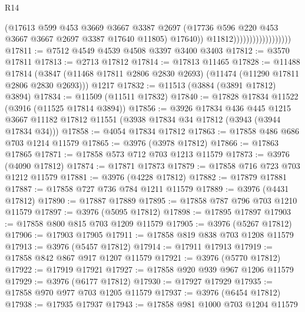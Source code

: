 \begin{lexlean}{R14}
\begin{coremodule}
                                          (@17613
                                            @599
                                            @453
                                            @3669
                                            @3667
                                            @3387
                                            @2697
                                            (@17736
                                              @596
                                              @220
                                              @453
                                              @3667
                                              @3667
                                              @2697
                                              @3387
                                              @17640
                                              @11805)
                                            @17640))
                                        @11812))))))))))))))))))
@17811 := @7512 @4549 @4539 @4508 @3397 @3400 @3403
@17812 := @3570 @17811
@17813 := @2713 @17812
@17814 := @17813 @11465
@17828 := @11488
    @17814
    (@3847 (@11468 @17811 @2806 @2830 @2693) (@11474 (@11290 @17811 @2806 @2830 @2693)))
    @1217
@17832 := @11513 (@3884 (@3891 @17812) @3894)
@17834 := @11509 (@11511 @17832)
@17840 := @17828 @17834 @11522 (@3916 (@11525 @17814 @3894))
@17856 := @3926
    @17834
    @436
    @445
    @1215
    @3667
    @11182
    @17812
    @11551
    (@3938 @17834 @34 @17812 (@3943 (@3944 @17834 @34)))
@17858 := @4054 @17834 @17812
@17863 := @17858 @486 @686 @703 @1214 @11579
@17865 := @3976 (@3978 @17812)
@17866 := @17863 @17865
@17871 := @17858 @573 @712 @703 @1213 @11579
@17873 := @3976 (@4090 @17812)
@17874 := @17871 @17873
@17879 := @17858 @716 @723 @703 @1212 @11579
@17881 := @3976 (@4228 @17812)
@17882 := @17879 @17881
@17887 := @17858 @727 @736 @784 @1211 @11579
@17889 := @3976 (@4431 @17812)
@17890 := @17887 @17889
@17895 := @17858 @787 @796 @703 @1210 @11579
@17897 := @3976 (@5095 @17812)
@17898 := @17895 @17897
@17903 := @17858 @800 @815 @703 @1209 @11579
@17905 := @3976 (@5267 @17812)
@17906 := @17903 @17905
@17911 := @17858 @819 @838 @703 @1208 @11579
@17913 := @3976 (@5457 @17812)
@17914 := @17911 @17913
@17919 := @17858 @842 @867 @917 @1207 @11579
@17921 := @3976 (@5770 @17812)
@17922 := @17919 @17921
@17927 := @17858 @920 @939 @967 @1206 @11579
@17929 := @3976 (@6177 @17812)
@17930 := @17927 @17929
@17935 := @17858 @970 @977 @703 @1205 @11579
@17937 := @3976 (@6454 @17812)
@17938 := @17935 @17937
@17943 := @17858 @981 @1000 @703 @1204 @11579

\end{coremodule}
\end{lexlean}
